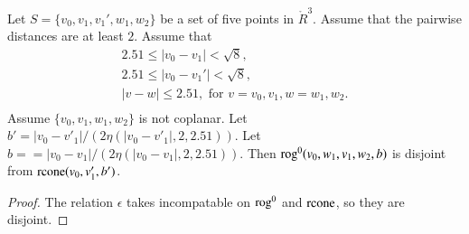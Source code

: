 \begin{lemma}
Let $S=\{v_0,v_1,v_1',w_1,w_2\}$ be a set of five points in $\ring{R}^3$.
Assume that the pairwise distances are at least $2$.  Assume
that 
  $$\begin{array}{lll}
  2.51 \le |v_0-v_1| < \sqrt8,\\
  2.51\le |v_0-v_1'| < \sqrt8,\\
  |v-w|\le 2.51, \text{ for } v=v_0,v_1, w=w_1,w_2.\\
  \end{array}
  $$
Assume $\{v_0,v_1,w_1,w_2\}$ is not coplanar.  
Let $b' = |v_0-v'_1|/(2\eta(|v_0-v'_1|,2,2.51))$.  
Let $b== |v_0-v_1|/(2\eta(|v_0-v_1|,2,2.51))$.  
Then
${\operatorname{rog}}^0(v_0,w_1,v_1,w_2,b)$ is disjoint from ${\operatorname{rcone}}(v_0,v_1',b')$.
\end{lemma}


\begin{proof} The relation $\epsilon$ takes incompatable on
${\operatorname{rog}}^0$ and ${\operatorname{rcone}}$, so they are disjoint.
\end{proof}

\newpage


